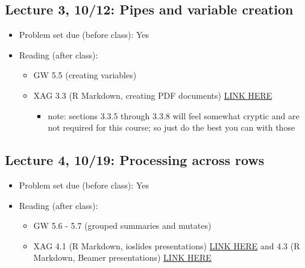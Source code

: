 \documentclass[11pt,]{article}
\providecommand{\tightlist}{%
  \setlength{\itemsep}{0pt}\setlength{\parskip}{0pt}}
\begin{document}
\subsection{Lecture 3, 10/12: Pipes and variable
creation}\label{lecture-3-1012-pipes-and-variable-creation}

\begin{itemize}
\tightlist
\item
  Problem set due (before class): Yes
\item
  Reading (after class):

  \begin{itemize}
  \tightlist
  \item
    GW 5.5 (creating variables)
  \item
    XAG 3.3 (R Markdown, creating PDF documents)
    \href{https://bookdown.org/yihui/rmarkdown/pdf-document.html}{LINK
    HERE}

    \begin{itemize}
    \tightlist
    \item
      note: sections 3.3.5 through 3.3.8 will feel somewhat cryptic and
      are not required for this course; so just do the best you can with
      those
    \end{itemize}
  \end{itemize}
\end{itemize}

\subsection{Lecture 4, 10/19: Processing across
rows}\label{lecture-4-1019-processing-across-rows}

\begin{itemize}
\tightlist
\item
  Problem set due (before class): Yes
\item
  Reading (after class):

  \begin{itemize}
  \tightlist
  \item
    GW 5.6 - 5.7 (grouped summaries and mutates)
  \item
    XAG 4.1 (R Markdown, ioslides presentations)
    \href{https://bookdown.org/yihui/rmarkdown/ioslides-presentation.html}{LINK
    HERE} and 4.3 (R Markdown, Beamer presentations)
    \href{https://bookdown.org/yihui/rmarkdown/beamer-presentation.html}{LINK
    HERE}
  \end{itemize}
\end{itemize}
\end{document}
